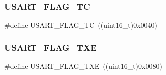 \subsubsection{\texorpdfstring{USART\_FLAG\_TC}{USART\_FLAG\_TC}}
{\footnotesize\ttfamily \#define U\+S\+A\+R\+T\+\_\+\+F\+L\+A\+G\+\_\+\+TC~((uint16\+\_\+t)0x0040)}

\mbox{\label{group___u_s_a_r_t___flags_ga7129f13333f2a7218838cc32fe507bfa}} 
\subsubsection{\texorpdfstring{USART\_FLAG\_TXE}{USART\_FLAG\_TXE}}
{\footnotesize\ttfamily \#define U\+S\+A\+R\+T\+\_\+\+F\+L\+A\+G\+\_\+\+T\+XE~((uint16\+\_\+t)0x0080)}

